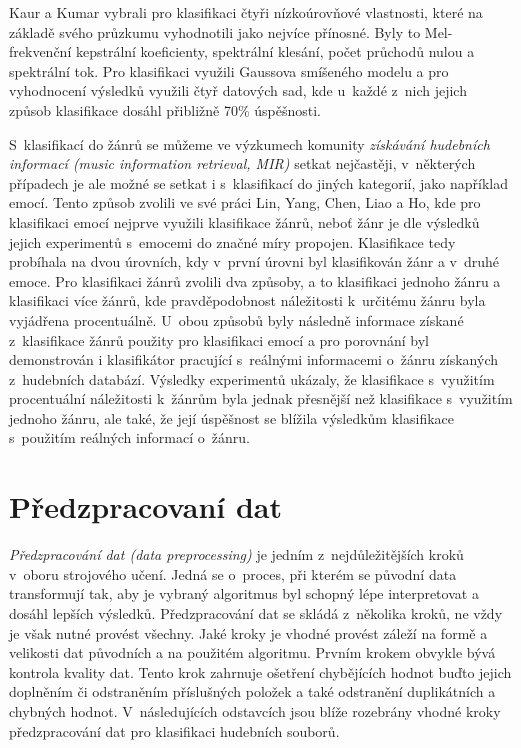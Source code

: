 Kaur a Kumar vybrali pro klasifikaci čtyři nízkoúrovňové vlastnosti, které na základě svého průzkumu vyhodnotili jako nejvíce přínosné. Byly to Mel-frekvenční kepstrální koeficienty, spektrální klesání, počet průchodů nulou a spektrální tok. Pro klasifikaci využili Gaussova smíšeného modelu a pro vyhodnocení výsledků využili čtyř datových sad, kde u~každé z~nich jejich způsob klasifikace dosáhl přibližně 70\% úspěšnosti.\cite{8365395}

S~klasifikací do žánrů se můžeme ve výzkumech komunity \textit{získávání hudebních informací (music information retrieval, MIR)} setkat nejčastěji, v~některých případech je ale možné se setkat i s~klasifikací do jiných kategorií, jako například emocí. Tento způsob zvolili ve své práci Lin, Yang, Chen, Liao a Ho, kde pro klasifikaci emocí nejprve využili klasifikace žánrů, neboť žánr je dle výsledků jejich experimentů s~emocemi do značné míry propojen. Klasifikace tedy probíhala na dvou úrovních, kdy v~první úrovni byl klasifikován žánr a v~druhé emoce. Pro klasifikaci žánrů zvolili dva způsoby, a to klasifikaci jednoho žánru a klasifikaci více žánrů, kde pravděpodobnost náležitosti k~určitému žánru byla vyjádřena procentuálně. U~obou způsobů byly následně informace získané z~klasifikace žánrů použity pro klasifikaci emocí a pro porovnání byl demonstrován i klasifikátor pracující s~reálnými informacemi o~žánru získaných z~hudebních databází. Výsledky experimentů ukázaly, že klasifikace s~využitím procentuální náležitosti k~žánrům byla jednak přesnější než klasifikace s~využitím jednoho žánru, ale také, že její úspěšnost se blížila výsledkům klasifikace s~použitím reálných informací o~žánru.\cite{5202572}

\chapter{Předzpracovaní dat}
\label{predzpracovani_dat}
\textit{Předzpracování dat (data preprocessing)} je jedním z~nejdůležitějších kroků v~oboru strojového učení. Jedná se o~proces, při kterém se původní data transformují tak, aby je vybraný algoritmus byl schopný lépe interpretovat a dosáhl lepších výsledků. Předzpracování dat se skládá z~několika kroků, ne vždy je však nutné provést všechny. Jaké kroky je vhodné provést záleží na formě a velikosti dat původních a na použitém algoritmu. Prvním krokem obvykle bývá kontrola kvality dat. Tento krok zahrnuje ošetření chybějících hodnot buďto jejich doplněním či odstraněním příslušných položek a také odstranění duplikátních a chybných hodnot. V~následujících odstavcích jsou blíže rozebrány vhodné kroky předzpracování dat pro klasifikaci hudebních souborů.\cite{data_preprocessing}\cite{aca}

